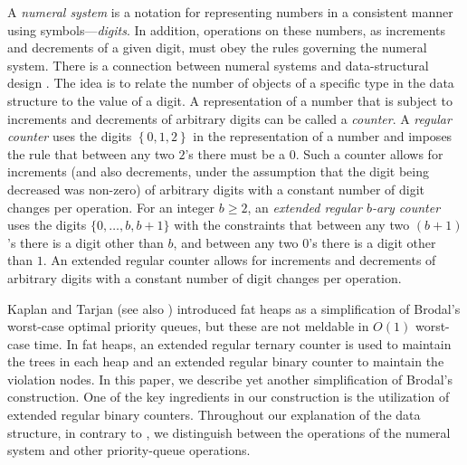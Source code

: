 \documentclass{llncs}
\newcommand{\set}[1]{\left\{#1\right\}}
\begin{document}
A \emph{numeral system} is a notation for representing numbers 
in a consistent manner using symbols---\emph{digits}. 
In addition, operations on these numbers, as
increments and decrements of a given digit, must obey the rules
governing the numeral system.  There is a connection between numeral systems and
data-structural design \cite{CK77,Vui78}.  The idea is to relate the
number of objects of a specific type in the data structure to the
value of a digit.  
A representation of a number that is subject to increments and
decrements of arbitrary digits can be called a \emph{counter}. A
\emph{regular counter} \cite{CK77} uses the digits $\set{0, 1, 2}$ in
the representation of a number and imposes the rule that between any
two $2$'s there must be a $0$. Such a counter allows for increments 
(and also decrements, under the assumption that the digit being decreased was
non-zero) of arbitrary digits with a constant number 
of digit changes per operation. For an integer $b \geq 2$, an 
\emph{extended regular $b$-ary counter} uses the digits $\{0,\ldots,b, b+1\}$ 
with the constraints that between any two $(b+1)$'s there is a digit other 
than $b$, and between any two $0$'s there is a digit other than $1$.  
An extended regular counter \cite{CK77,KST02} allows for increments and decrements 
of arbitrary digits with a constant number of digit changes per operation.

Kaplan and Tarjan \cite{KT99} (see also \cite{KST02}) introduced fat
heaps as a simplification of Brodal's worst-case optimal priority
queues, but these are not meldable in $O(1)$ worst-case time. In fat
heaps, an extended regular ternary counter is used to maintain the
trees in each heap and an extended regular binary counter to maintain
the violation nodes. In this paper, we describe yet another
simplification of Brodal's construction.  One of the key ingredients 
in our construction is the utilization of extended regular binary
counters.  Throughout our explanation of the data structure, in
contrary to \cite{Bro96}, we distinguish between the operations of
the numeral system and other priority-queue operations.
\end{document}
